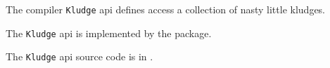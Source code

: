 
The compiler {\tt Kludge} api defines access a collection of nasty little kludges.

The {\tt Kludge} api is implemented by the  package. 

The {\tt Kludge} api source code is in .







